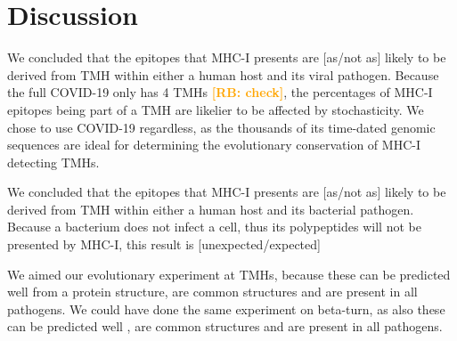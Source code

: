 \documentclass{article}
\newcommand{\frans}[1]{\textcolor{blue}{\textbf{[FB: #1]}}}
\newcommand{\richel}[1]{\textcolor{orange}{\textbf{[RB: #1]}}}
\begin{document}
\section{Discussion}

We concluded that the
epitopes that MHC-I presents are [as/not as] likely 
to be derived from TMH within either a human host and its viral pathogen.
Because the full COVID-19 only has 4 TMHs \richel{check}, the percentages
of MHC-I epitopes being part of a TMH are likelier to be affected by
stochasticity. We chose to use COVID-19 regardless, as the thousands
of its time-dated genomic sequences are ideal for determining the 
evolutionary conservation of MHC-I detecting TMHs. 

We concluded that the
epitopes that MHC-I presents are [as/not as] likely 
to be derived from TMH within either a human host and its bacterial pathogen.
Because a bacterium does not infect a cell, thus its polypeptides
will not be presented by MHC-I, this result is [unexpected/expected]

We aimed our evolutionary experiment at TMHs, because these can
be predicted well from a protein structure,
are common structures and are present in all pathogens. 
We could have done the same experiment on beta-turn,
as also these can be predicted well \cite{petersen2010netturnp},
are common structures and are present in all pathogens.


\end{document}
